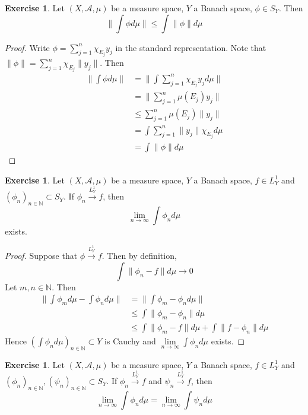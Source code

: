 \documentclass[12pt]{amsart}
\theoremstyle{definition}
\newtheorem{ex}[definition]{Exercise}
\newcommand{\N}{\mathbb{N}}
\newcommand{\MA}{\mathcal{A}}
\newcommand{\limn}{\lim \limits_{n \rightarrow \infty}}
\newcommand{\conv}[1]{\xrightarrow{#1}}
\newcommand{\lex}[1]{\label{ex:#1}}
\begin{document}
	\begin{ex} \lex{00000} 
	Let $(X, \MA, \mu)$ be a measure space, $Y$ a Banach space, $\phi \in S_Y$. Then $$\bigg \| \int \phi d\mu   \bigg \|  \leq \int \|\phi \| d \mu$$
	\end{ex}
	
	\begin{proof}
	Write $\phi = \sum\limits_{j=1}^n\chi_{E_j}y_j$ in the standard representation. Note that $\|\phi \| = \sum\limits_{j=1}^n\chi_{E_j} \|y_j\|$. Then 
	\begin{align*}
	\bigg \|  \int \phi d\mu  \bigg \| 
	&=  \bigg \|  \int \sum\limits_{j=1}^n\chi_{E_j}y_j  d\mu  \bigg \| \\
	&= \bigg \| \sum\limits_{j=1}^n \mu(E_j)y_j \bigg \| \\
	& \leq \sum\limits_{j=1}^n \mu(E_j) \|y_j \| \\
	&= \int \sum\limits_{j=1}^n \|y_j \| \chi_{E_j} d \mu \\
	&= \int \|\phi \| d\mu
	\end{align*}
	\end{proof}
	
	\begin{ex} \lex{00000} 
	Let $(X, \MA, \mu)$ be a measure space, $Y$ a Banach space, $f \in L^1_Y$ and $(\phi_n)_{n \in \N} \subset S_Y$. If $\phi_n \conv{L^1_Y} f$, then $$\limn \int \phi_n d\mu $$ exists.
	\end{ex}
	
	\begin{proof}
	Suppose that $\phi \conv{L^1_Y} f$. Then by definition, $$\int \|\phi_n -f\| d\mu \rightarrow 0$$ Let $m,n \in \N$. Then 
	\begin{align*}
	\bigg \|\int \phi_m d\mu - \int \phi_n d\mu \bigg \| 
	&= \bigg \| \int \phi_m  - \phi_n d\mu  \bigg \| \\
	& \leq  \int \|\phi_m  - \phi_n\| d \mu \\
	& \leq \int \|\phi_m  - f \| d \mu + \int \|f  - \phi_n\| d \mu
	\end{align*}
	Hence $( \int \phi_n  d \mu)_{n \in \N} \subset Y$ is Cauchy and $\lim\limits_{n \rightarrow \infty} \int \phi_n d\mu$ exists.
\end{proof}		

	\begin{ex} \lex{00000} 
	Let $(X, \MA, \mu)$ be a measure space, $Y$ a Banach space, $f \in L^1_Y$ and $(\phi_n)_{n \in \N}, (\psi_n)_{n \in \N} \subset S_Y$. If $\phi_n \conv{L^1_Y} f$ and $\psi_n \conv{L^1_Y} f$, then $$\lim\limits_{n \rightarrow \infty} \int \phi_n d\mu = \lim\limits_{n \rightarrow \infty} \int \psi_n d\mu$$
	\end{ex}
	
\end{document}
